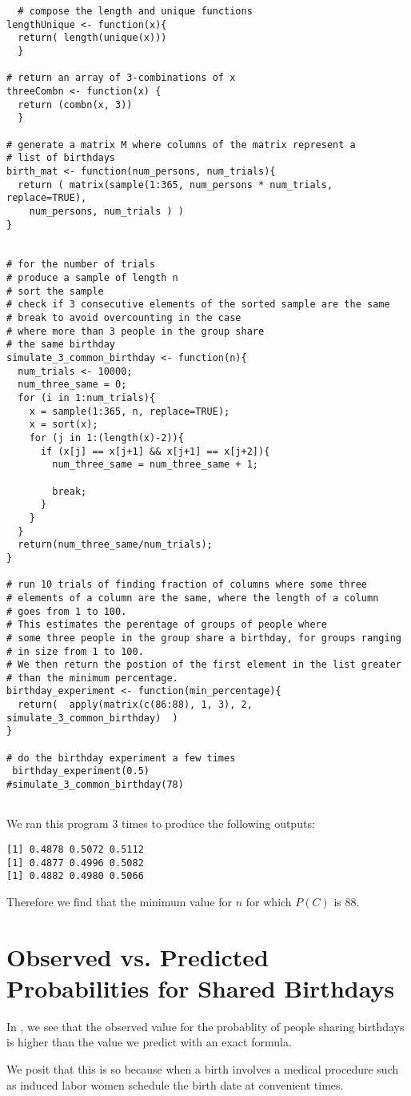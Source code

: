 \documentclass[a4paper,11pt]{article}
\begin{document}
\begin{lstlisting}
  # compose the length and unique functions
lengthUnique <- function(x){
  return( length(unique(x)))
  }

# return an array of 3-combinations of x
threeCombn <- function(x) { 
  return (combn(x, 3))
  }

# generate a matrix M where columns of the matrix represent a
# list of birthdays
birth_mat <- function(num_persons, num_trials){
  return ( matrix(sample(1:365, num_persons * num_trials, replace=TRUE), 
    num_persons, num_trials ) )
}


# for the number of trials
# produce a sample of length n
# sort the sample
# check if 3 consecutive elements of the sorted sample are the same
# break to avoid overcounting in the case
# where more than 3 people in the group share
# the same birthday
simulate_3_common_birthday <- function(n){
  num_trials <- 10000;
  num_three_same = 0;
  for (i in 1:num_trials){
    x = sample(1:365, n, replace=TRUE);
    x = sort(x);
    for (j in 1:(length(x)-2)){
      if (x[j] == x[j+1] && x[j+1] == x[j+2]){
        num_three_same = num_three_same + 1;
        
        break;
      }
    }
  }
  return(num_three_same/num_trials);
}

# run 10 trials of finding fraction of columns where some three
# elements of a column are the same, where the length of a column
# goes from 1 to 100.
# This estimates the perentage of groups of people where 
# some three people in the group share a birthday, for groups ranging
# in size from 1 to 100.
# We then return the postion of the first element in the list greater 
# than the minimum percentage.
birthday_experiment <- function(min_percentage){
  return(  apply(matrix(c(86:88), 1, 3), 2, simulate_3_common_birthday)  )
}

# do the birthday experiment a few times
 birthday_experiment(0.5)
#simulate_3_common_birthday(78)


\end{lstlisting}

We ran this program 3 times to produce the following outputs:

\begin{lstlisting}
[1] 0.4878 0.5072 0.5112
[1] 0.4877 0.4996 0.5082
[1] 0.4882 0.4980 0.5066
\end{lstlisting}

Therefore we find that the minimum value for $n$ for which
$P\left( C \right)$ is $88$.
\printbibliography{}

\section{Observed vs. Predicted Probabilities for Shared Birthdays}

In \cite{mulliganBDayData}, we see that the observed value for the
probablity of people sharing birthdays is higher than the value
we predict with an exact formula.

We posit that this is so because when a birth involves a medical 
procedure such as induced labor women schedule the birth date at 
convenient times.
\end{document}
